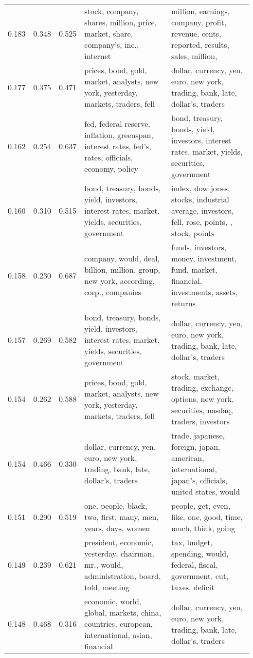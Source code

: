 \begin{tabular}{cccp{5cm}p{5cm}}
0.183 & 0.348 & 0.525 & stock, company, shares, million, price, market, share, company's, inc., internet & million, earnings, company, profit, revenue, cents, reported, results, sales, million,  \\
0.177 & 0.375 & 0.471 & prices, bond, gold, market, analysts, new york, yesterday, markets, traders, fell & dollar, currency, yen, euro, new york, trading, bank, late, dollar's, traders \\
0.162 & 0.254 & 0.637 & fed, federal reserve, inflation, greenspan, interest rates, fed's, rates, officials, economy, policy & bond, treasury, bonds, yield, investors, interest rates, market, yields, securities, government \\
0.160 & 0.310 & 0.515 & bond, treasury, bonds, yield, investors, interest rates, market, yields, securities, government & index, dow jones, stocks, industrial average, investors, fell, rose, points, , stock, points \\
0.158 & 0.230 & 0.687 & company, would, deal, billion, million, group, new york, according, corp., companies & funds, investors, money, investment, fund, market, financial, investments, assets, returns \\
0.157 & 0.269 & 0.582 & bond, treasury, bonds, yield, investors, interest rates, market, yields, securities, government & dollar, currency, yen, euro, new york, trading, bank, late, dollar's, traders \\
0.154 & 0.262 & 0.588 & prices, bond, gold, market, analysts, new york, yesterday, markets, traders, fell & stock, market, trading, exchange, options, new york, securities, nasdaq, traders, investors \\
0.154 & 0.466 & 0.330 & dollar, currency, yen, euro, new york, trading, bank, late, dollar's, traders & trade, japanese, foreign, japan, american, international, japan's, officials, united states, would \\
0.151 & 0.290 & 0.519 & one, people, black, two, first, many, men, years, days, women & people, get, even, like, one, good, time, much, think, going \\
0.149 & 0.239 & 0.621 & president, economic, yesterday, chairman, mr., would, administration, board, told, meeting & tax, budget, spending, would, federal, fiscal, government, cut, taxes, deficit \\
0.148 & 0.468 & 0.316 & economic, world, global, markets, china, countries, european, international, asian, financial & dollar, currency, yen, euro, new york, trading, bank, late, dollar's, traders \\

\end{tabular}
